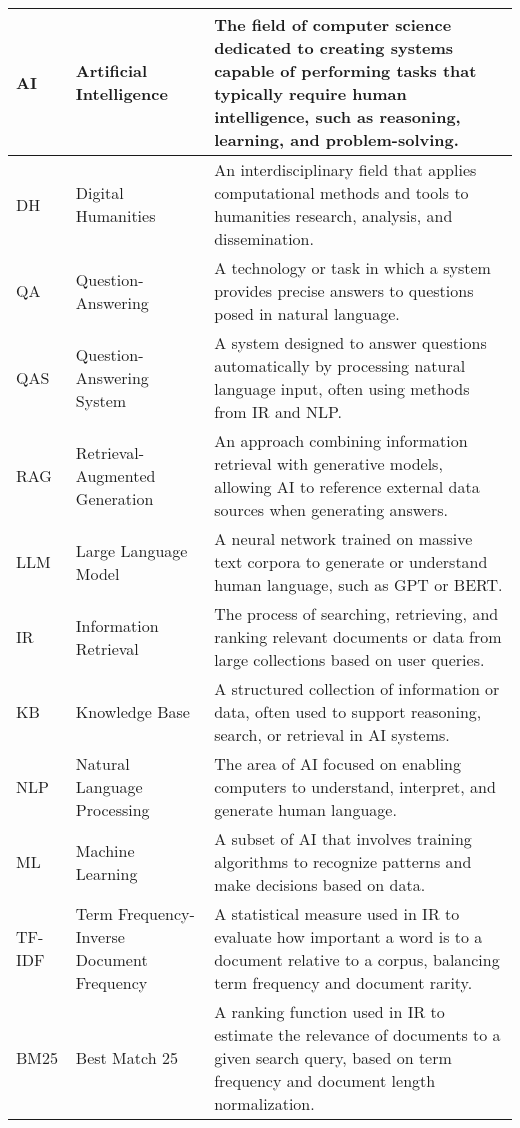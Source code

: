 \begin{tabularx}{\textwidth}{
  >{\raggedright\arraybackslash}p{2.5cm}
  >{\raggedright\arraybackslash}p{4cm}
  >{\noindent\justifying\arraybackslash}X
}
AI    & Artificial Intelligence & The field of computer science dedicated to creating systems capable of performing tasks that typically require human intelligence, such as reasoning, learning, and problem-solving. \\
\cmidrule(lr){1-3}
DH    & Digital Humanities & An interdisciplinary field that applies computational methods and tools to humanities research, analysis, and dissemination. \\
\cmidrule(lr){1-3}
QA    & Question-Answering & A technology or task in which a system provides precise answers to questions posed in natural language. \\
\cmidrule(lr){1-3}
QAS   & Question-Answering System & A system designed to answer questions automatically by processing natural language input, often using methods from IR and NLP. \\
\cmidrule(lr){1-3}
RAG   & Retrieval-Augmented Generation & An approach combining information retrieval with generative models, allowing AI to reference external data sources when generating answers. \\
\cmidrule(lr){1-3}
LLM   & Large Language Model & A neural network trained on massive text corpora to generate or understand human language, such as GPT or BERT. \\
\cmidrule(lr){1-3}
IR    & Information Retrieval & The process of searching, retrieving, and ranking relevant documents or data from large collections based on user queries. \\
\cmidrule(lr){1-3}
KB    & Knowledge Base & A structured collection of information or data, often used to support reasoning, search, or retrieval in AI systems. \\
\cmidrule(lr){1-3}
NLP   & Natural Language Processing & The area of AI focused on enabling computers to understand, interpret, and generate human language. \\
\cmidrule(lr){1-3}
ML    & Machine Learning & A subset of AI that involves training algorithms to recognize patterns and make decisions based on data. \\
\cmidrule(lr){1-3}
TF-IDF & Term Frequency-Inverse Document Frequency & A statistical measure used in IR to evaluate how important a word is to a document relative to a corpus, balancing term frequency and document rarity. \\
\cmidrule(lr){1-3}
BM25  & Best Match 25 & A ranking function used in IR to estimate the relevance of documents to a given search query, based on term frequency and document length normalization.\\

\end{tabularx}

